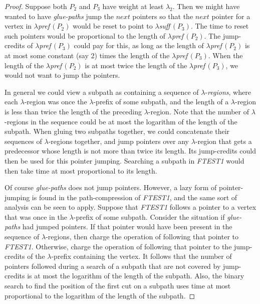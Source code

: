 {{{\begin{proof}
Suppose both $P_2$ and $P_3$ have weight at least $\lambda_2$.
Then we might have wanted to have {\it glue-paths} jump the $next$ pointers
so that the $next$ pointer for a vertex in $\lambda${\it pref}$\,(P_2)$
would be reset to point to $\lambda${\it suff}$\,(P_3)$.
The time to reset such pointers would be proportional to the length
of $\lambda${\it pref}$\,(P_2)$.
The jump-credits of $\lambda${\it pref}$\,(P_3)$ could pay for this,
as long as the length of $\lambda${\it pref}$\,(P_2)$
is at most some constant (say 2)
times the length of the $\lambda${\it pref}$\,(P_3)$.
When the length of the $\lambda${\it pref}$\,(P_2)$
is at most twice the length of the $\lambda${\it pref}$\,(P_3)$,
we would not want to jump the pointers.

In general we could view a subpath as containing a sequence of
$\lambda$-{\it regions},
where each $\lambda$-region was once the $\lambda$-prefix of some subpath,
and the length of a $\lambda$-region is less than twice the length
of the preceding $\lambda$-region.
Note that the number of $\lambda$-regions in the sequence could be at most
the logarithm of the length of the subpath.
When gluing two subpaths together,
we could concatenate their sequences of $\lambda$-regions together,
and jump pointers over any $\lambda$-region that gets a predecessor
whose length is not more than twice its length.
Its jump-credits could then be used for this pointer jumping.
Searching a subpath in {\it FTEST1} would then take
time at most proportional to its length.

Of course {\it glue-paths} does not jump pointers.
However,
a lazy form of pointer-jumping is found in the path-compression of {\it FTEST1},
and the same sort of analysis can be seen to apply.
Suppose that {\it FTEST1} follows a pointer to a vertex
that was once in the $\lambda$-prefix of some subpath.
Consider the situation if {\it glue-paths} had jumped pointers.
If that pointer would have been present in the sequence of $\lambda$-regions,
then charge the operation of following that pointer to {\it FTEST1}.
Otherwise, charge the operation of following that pointer
to the jump-credits of the $\lambda$-prefix containing the vertex.
It follows that the number of pointers followed during a search
of a subpath that are not covered by jump-credits is at most
the logarithm of the length of the subpath.
Also, the binary search to find the position of the first cut
on a subpath uses time at most proportional
to the logarithm of the length of the subpath.
\end{proof}

}}}
